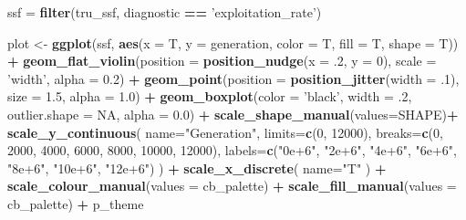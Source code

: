 \documentclass[]{book}
\newenvironment{Shaded}{\begin{snugshade}}{\end{snugshade}}
\newcommand{\DataTypeTok}[1]{\textcolor[rgb]{0.13,0.29,0.53}{#1}}
\newcommand{\DecValTok}[1]{\textcolor[rgb]{0.00,0.00,0.81}{#1}}
\newcommand{\FloatTok}[1]{\textcolor[rgb]{0.00,0.00,0.81}{#1}}
\newcommand{\KeywordTok}[1]{\textcolor[rgb]{0.13,0.29,0.53}{\textbf{#1}}}
\newcommand{\NormalTok}[1]{#1}
\newcommand{\OperatorTok}[1]{\textcolor[rgb]{0.81,0.36,0.00}{\textbf{#1}}}
\newcommand{\OtherTok}[1]{\textcolor[rgb]{0.56,0.35,0.01}{#1}}
\newcommand{\StringTok}[1]{\textcolor[rgb]{0.31,0.60,0.02}{#1}}
\begin{document}
\begin{Shaded}
\begin{Highlighting}[]
\NormalTok{ssf =}\StringTok{ }\KeywordTok{filter}\NormalTok{(tru_ssf, diagnostic }\OperatorTok{==}\StringTok{ 'exploitation_rate'}\NormalTok{)}

\NormalTok{plot <-}\StringTok{ }\KeywordTok{ggplot}\NormalTok{(ssf, }\KeywordTok{aes}\NormalTok{(}\DataTypeTok{x =}\NormalTok{ T, }\DataTypeTok{y =}\NormalTok{ generation, }\DataTypeTok{color =}\NormalTok{ T, }\DataTypeTok{fill =}\NormalTok{ T, }\DataTypeTok{shape =}\NormalTok{ T)) }\OperatorTok{+}
\StringTok{  }\KeywordTok{geom_flat_violin}\NormalTok{(}\DataTypeTok{position =} \KeywordTok{position_nudge}\NormalTok{(}\DataTypeTok{x =} \FloatTok{.2}\NormalTok{, }\DataTypeTok{y =} \DecValTok{0}\NormalTok{), }\DataTypeTok{scale =} \StringTok{'width'}\NormalTok{, }\DataTypeTok{alpha =} \FloatTok{0.2}\NormalTok{) }\OperatorTok{+}
\StringTok{  }\KeywordTok{geom_point}\NormalTok{(}\DataTypeTok{position =} \KeywordTok{position_jitter}\NormalTok{(}\DataTypeTok{width =} \FloatTok{.1}\NormalTok{), }\DataTypeTok{size =} \FloatTok{1.5}\NormalTok{, }\DataTypeTok{alpha =} \FloatTok{1.0}\NormalTok{) }\OperatorTok{+}
\StringTok{  }\KeywordTok{geom_boxplot}\NormalTok{(}\DataTypeTok{color =} \StringTok{'black'}\NormalTok{, }\DataTypeTok{width =} \FloatTok{.2}\NormalTok{, }\DataTypeTok{outlier.shape =} \OtherTok{NA}\NormalTok{, }\DataTypeTok{alpha =} \FloatTok{0.0}\NormalTok{) }\OperatorTok{+}
\StringTok{  }\KeywordTok{scale_shape_manual}\NormalTok{(}\DataTypeTok{values=}\NormalTok{SHAPE)}\OperatorTok{+}
\StringTok{  }\KeywordTok{scale_y_continuous}\NormalTok{(}
    \DataTypeTok{name=}\StringTok{"Generation"}\NormalTok{,}
    \DataTypeTok{limits=}\KeywordTok{c}\NormalTok{(}\DecValTok{0}\NormalTok{, }\DecValTok{12000}\NormalTok{),}
    \DataTypeTok{breaks=}\KeywordTok{c}\NormalTok{(}\DecValTok{0}\NormalTok{, }\DecValTok{2000}\NormalTok{, }\DecValTok{4000}\NormalTok{, }\DecValTok{6000}\NormalTok{, }\DecValTok{8000}\NormalTok{, }\DecValTok{10000}\NormalTok{, }\DecValTok{12000}\NormalTok{),}
    \DataTypeTok{labels=}\KeywordTok{c}\NormalTok{(}\StringTok{"0e+6"}\NormalTok{, }\StringTok{"2e+6"}\NormalTok{, }\StringTok{"4e+6"}\NormalTok{, }\StringTok{"6e+6"}\NormalTok{, }\StringTok{"8e+6"}\NormalTok{, }\StringTok{"10e+6"}\NormalTok{, }\StringTok{"12e+6"}\NormalTok{)}
\NormalTok{  ) }\OperatorTok{+}
\StringTok{  }\KeywordTok{scale_x_discrete}\NormalTok{(}
    \DataTypeTok{name=}\StringTok{"T"}
\NormalTok{  ) }\OperatorTok{+}
\StringTok{  }\KeywordTok{scale_colour_manual}\NormalTok{(}\DataTypeTok{values =}\NormalTok{ cb_palette) }\OperatorTok{+}
\StringTok{  }\KeywordTok{scale_fill_manual}\NormalTok{(}\DataTypeTok{values =}\NormalTok{ cb_palette) }\OperatorTok{+}
\StringTok{  }\NormalTok{p_theme}


\end{Highlighting}
\end{Shaded}
\end{document}
